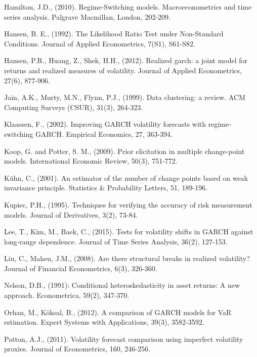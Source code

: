 \documentclass[preprint,12pt,authoryear]{elsarticle}
\begin{document}
\begin{thebibliography}{00}
 Hamilton, J.D., (2010). Regime-Switching models.
Macroeconometrics and time series analysis. Palgrave Macmillan, London, 202-209.

 Hansen, B. E., (1992). The Likelihood Ratio Test under Non-Standard Conditions. Journal of Applied Econometrics, 7(S1), S61-S82.

 Hansen, P.R., Huang, Z., Shek, H.H., (2012). Realized garch: a joint model for returns and realized measures of volatility. Journal of Applied Econometrics, 27(6), 877-906.

 Jain, A.K., Murty, M.N., Flynn, P.J., (1999). Data clustering: a review. ACM Computing Surveys (CSUR), 31(3), 264-323.

Klaassen, F., (2002). Improving GARCH volatility forecasts with regime-switching GARCH. Empirical Economics, 27, 363-394.

 Koop, G. and Potter, S. M., (2009). Prior elicitation in multiple change-point models. International Economic Review, 50(3), 751-772.

 Kühn, C., (2001). An estimator of the number of change points based on weak invariance principle. Statistics \& Probability Letters, 51, 189-196.

 Kupiec, P.H., (1995). Techniques for verifying the accuracy of risk measurement models. Journal of Derivatives, 3(2), 73-84.

Lee, T., Kim, M., Baek, C., (2015). Tests for volatility shifts in GARCH against long-range dependence. Journal of Time Series Analysis, 36(2), 127-153.

Liu, C., Maheu, J.M., (2008). Are there structural breaks in realized volatility? Journal of Financial Econometrics, 6(3), 326-360.

 Nelson, D.B., (1991): Conditional heteroskedasticity in asset returns: A new approach. Econometrica, 59(2), 347-370.

 Orhan, M., K\"oksal, B., (2012). A comparison of GARCH models for VaR estimation. Expert Systems with Applications, 39(3), 3582-3592.

 Patton, A.J., (2011). Volatility forecast comparison using imperfect volatility proxies.
Journal of Econometrics, 160, 246-256.


\end{thebibliography}
\end{document}
